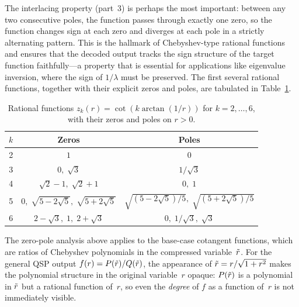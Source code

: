The interlacing property (part~3) is perhaps the most
important: between any two consecutive poles, the function
passes through exactly one zero, so the function changes sign
at each zero and diverges at each pole in a strictly
alternating pattern.  This is the hallmark of Chebyshev-type
rational functions and ensures that the decoded output tracks
the sign structure of the target function faithfully---a
property that is essential for applications like eigenvalue
inversion, where the sign of $1/\lambda$ must be preserved.
The first several rational functions, together with their
explicit zeros and poles, are tabulated in
Table~\ref{tab:rational}.

\begin{table}[t]
	\caption{Rational functions $z_k(r) = \cot(k\arctan(1/r))$ for $k = 2, \ldots, 6$, with their zeros and poles on $r > 0$.}
	\label{tab:rational}
	\begin{ruledtabular}
		\begin{tabular}{ccc}
			$k$ & Zeros                                           & Poles                                              \\
			\hline
			2   & $1$                                             & $0$                                                \\
			3   & $0,\; \sqrt{3}$                                 & $1/\sqrt{3}$                                       \\
			4   & $\sqrt{2}-1,\; \sqrt{2}+1$                      & $0,\; 1$                                           \\
			5   & $0,\; \sqrt{5-2\sqrt{5}},\; \sqrt{5+2\sqrt{5}}$ & $\sqrt{(5-2\sqrt{5})/5},\; \sqrt{(5+2\sqrt{5})/5}$ \\
			6   & $2-\sqrt{3},\; 1,\; 2+\sqrt{3}$                 & $0,\; 1/\sqrt{3},\; \sqrt{3}$
		\end{tabular}
	\end{ruledtabular}
\end{table}

The zero-pole analysis above applies to the base-case
cotangent functions, which are ratios of Chebyshev polynomials
in the compressed variable~$\tilde{r}$.  For the general QSP
output $f(r) = P(\tilde{r})/Q(\tilde{r})$, the appearance of
$\tilde{r} = r/\sqrt{1+r^2}$ makes the polynomial structure in
the original variable~$r$ opaque: $P(\tilde{r})$ is a polynomial
in $\tilde{r}$ but a rational function of~$r$, so even the
\emph{degree} of $f$ as a function of~$r$ is not immediately
visible.

